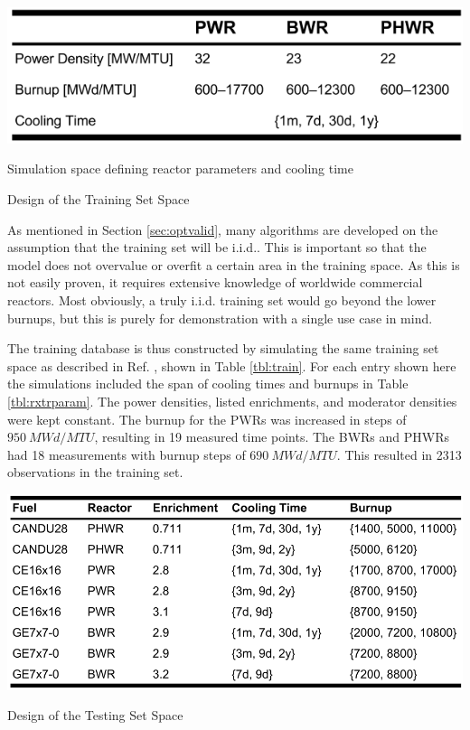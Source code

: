 \begin{table}[!hp]
  \begin{subtable}{\linewidth}
    \centering
    \includegraphics[width=0.7\linewidth]{./chapters/demo_method/TrainData2.png}
    \caption{Simulation space defining reactor parameters and cooling time}
    \label{tbl:rxtrparam}
  \end{subtable}%
  \caption{Design of the Training Set Space}
  \label{tbl:train}
\end{table}

As mentioned in Section \ref{sec:optvalid}, many algorithms are developed on
the assumption that the training set will be \acrfull{i.i.d.}. This is
important so that the model does not overvalue or overfit a certain area in the
training space. As this is not easily proven, it requires extensive knowledge
of worldwide commercial reactors. Most obviously, a truly \gls{i.i.d.} training
set would go beyond the lower burnups, but this is purely for demonstration
with a single use case in mind.  

The training database is thus constructed by simulating the same training set
space as described in Ref.  \cite{dayman_feasibility_2013}, shown in Table
\ref{tbl:train}. For each entry shown here the simulations included the span of
cooling times and burnups in Table \ref{tbl:rxtrparam}. The power densities,
listed enrichments, and moderator densities were kept constant. The burnup for
the \glspl{PWR} was increased in steps of $950\ MWd/MTU$, resulting in 19
measured time points. The \glspl{BWR} and \glspl{PHWR} had 18 measurements with
burnup steps of $690\ MWd/MTU$.  This resulted in 2313 observations in the
training set.

\begin{table}[!hbt]
  \centering
  \includegraphics[width=0.95\linewidth]{./chapters/demo_method/TestData.png}
  \caption{Design of the Testing Set Space}
  \label{tbl:test}
\end{table}

